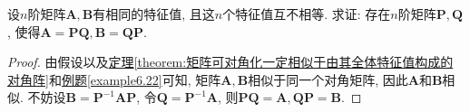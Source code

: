 \documentclass[../../main.tex]{subfiles}%
\begin{document}
\begin{example}
设$n$阶矩阵$\boldsymbol{A},\boldsymbol{B}$有相同的特征值, 且这$n$个特征值互不相等. 求证: 存在$n$阶矩阵$\boldsymbol{P},\boldsymbol{Q}$, 使得$\boldsymbol{A}=\boldsymbol{P}\boldsymbol{Q}, \boldsymbol{B}=\boldsymbol{Q}\boldsymbol{P}$.~
\end{example}
\begin{proof}
由假设以及\hyperref[theorem:矩阵可对角化一定相似于由其全体特征值构成的对角阵]{定理\ref{theorem:矩阵可对角化一定相似于由其全体特征值构成的对角阵}}和\hyperref[example6.22]{例题\ref{example6.22}}可知, 矩阵$\boldsymbol{A},\boldsymbol{B}$相似于同一个对角矩阵, 因此$\boldsymbol{A}$和$\boldsymbol{B}$相似. 不妨设$\boldsymbol{B}=\boldsymbol{P}^{-1}\boldsymbol{A}\boldsymbol{P}$, 令$\boldsymbol{Q}=\boldsymbol{P}^{-1}\boldsymbol{A}$, 则$\boldsymbol{P}\boldsymbol{Q}=\boldsymbol{A}, \boldsymbol{Q}\boldsymbol{P}=\boldsymbol{B}$. 
\end{proof}
\end{document}
